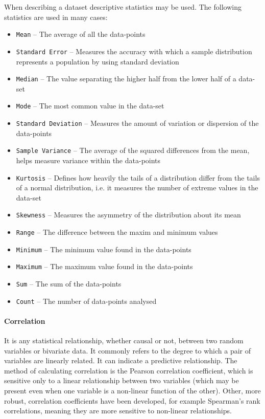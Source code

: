 When describing a dataset descriptive statistics may be used. The following statistics are used in many cases:
\begin{itemize}
    \item \texttt{Mean} -- The average of all the data-points
    \item \texttt{Standard Error} -- Measures the accuracy with which a sample distribution represents a population by using standard deviation
    \item \texttt{Median} -- The value separating the higher half from the lower half of a data-set
    \item \texttt{Mode} -- The most common value in the data-set
    \item \texttt{Standard Deviation} -- Measures the amount of variation or dispersion of the data-points
    \item \texttt{Sample Variance} -- The average of the squared differences from the mean, helps measure variance within the data-points
    \item \texttt{Kurtosis} -- Defines how heavily the tails of a distribution differ from the tails of a normal distribution, i.e. it measures the number of extreme values in the data-set
    \item \texttt{Skewness} -- Measures the asymmetry of the distribution about its mean
    \item \texttt{Range} -- The difference between the maxim and minimum values
    \item \texttt{Minimum} -- The minimum value found in the data-points
    \item \texttt{Maximum} -- The maximum value found in the data-points
    \item \texttt{Sum} -- The sum of the data-points
    \item \texttt{Count} -- The number of data-points analysed
\end{itemize}

\paragraph{Correlation}

It is any statistical relationship, whether causal or not, between two random variables or bivariate data. It commonly refers to the degree to which a pair of variables are linearly related. It can indicate a predictive relationship. The method of calculating correlation is the Pearson correlation coefficient, which is sensitive only to a linear relationship between two variables (which may be present even when one variable is a non-linear function of the other). Other, more robust, correlation coefficients have been developed, for example Spearman's rank correlations, meaning they are more sensitive to non-linear relationships.

